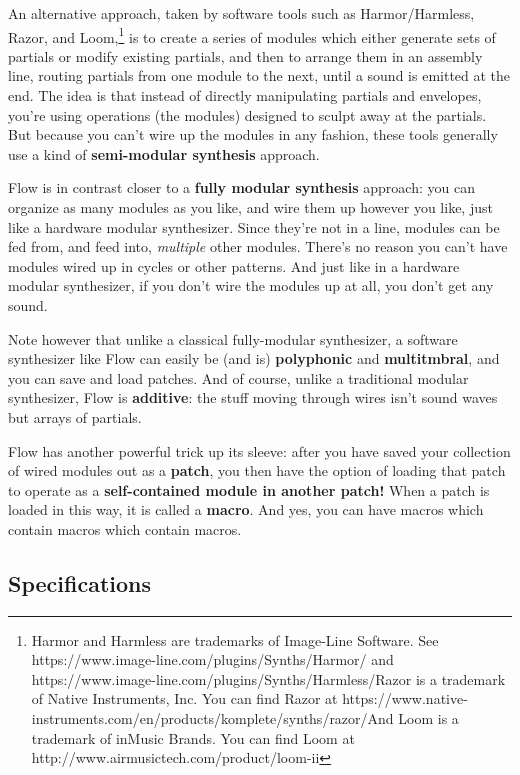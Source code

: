 \documentclass{article}
\newcommand\name{Flow}
\begin{document}
An alternative approach, taken by software tools such as Harmor/Harmless, Razor, and Loom,\footnote{Harmor and Harmless are trademarks of Image-Line Software.  See https:/\!/www.image-line.com/plugins/Synths/Harmor/  and https:/\!/www.image-line.com/plugins/Synths/Harmless/\qquad Razor is a trademark of Native Instruments, Inc.  You can find Razor at https:/\!/www.native-instruments.com/en/products/komplete/synths/razor/\qquad And Loom is a trademark of inMusic Brands.  You can find Loom at http:/\!/www.airmusictech.com/product/loom-ii}
is to create a series of modules which either generate sets of partials or modify existing partials, and then to arrange them in an assembly line, routing partials from one module to the next, until a sound is emitted at the end.  The idea is that instead of directly manipulating partials and envelopes, you're using operations (the modules) designed to sculpt away at the partials.  But because you can't wire up the modules in any fashion, these tools generally use a kind of {\bf semi-modular synthesis} approach.  

{\name} is in contrast closer to a {\bf fully modular synthesis} approach: you can organize as many modules as you like, and wire them up however you like, just like a hardware modular synthesizer. Since they're not in a line, modules can be fed from, and feed into, {\it multiple} other modules.  There's no reason you can't have modules wired up in cycles or other patterns.  And just like in a hardware modular synthesizer, if you don't wire the modules up at all, you don't get any sound. 

Note however that unlike a classical fully-modular synthesizer, a software synthesizer like {\name} can easily be (and is) {\bf polyphonic} and {\bf multitmbral}, and you can save and load patches.  And of course, unlike a traditional modular synthesizer, {\name} is {\bf additive}: the stuff moving through wires isn't sound waves but arrays of partials.

{\name} has another powerful trick up its sleeve: after you have saved your collection of wired modules out as a {\bf patch}, you then have the option of loading that patch to operate as a {\bf self-contained module in another patch!}  When a patch is loaded in this way, it is called a {\bf macro}.  And yes, you can have macros which contain macros which contain macros.


\subsection{Specifications}
\end{document}
